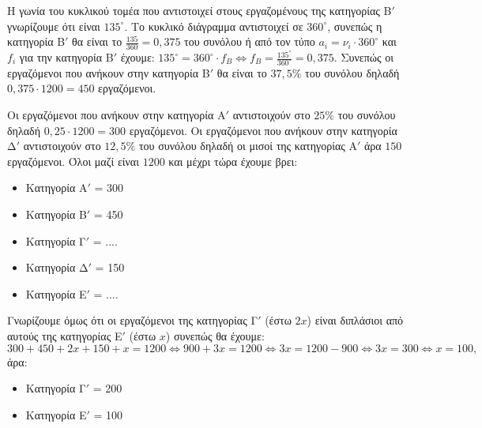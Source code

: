 \begin{alist}
\item Η γωνία του κυκλικού τομέα που αντιστοιχεί στους εργαζομένους της κατηγορίας Β$'$ γνωρίζουμε ότι είναι $135^\circ$. Το κυκλικό διάγραμμα αντιστοιχεί σε $360^\circ$, συνεπώς η κατηγορία Β$'$ θα είναι το $\frac{135}{360} = 0,375$ του συνόλου ή από τον τύπο $a_i = \nu_i \cdot 360^\circ$ και $f_i$ για την κατηγορία Β$'$ έχουμε: $135^\circ = 360^\circ \cdot f_B \Leftrightarrow f_B = \frac{135^\circ}{360^\circ} = 0,375$.
Συνεπώς οι εργαζόμενοι που ανήκουν στην κατηγορία Β$'$ θα είναι το $37,5\%$ του συνόλου δηλαδή $0,375 \cdot 1200 = 450$ εργαζόμενοι.

\item Οι εργαζόμενοι που ανήκουν στην κατηγορία Α$'$ αντιστοιχούν στο $25\%$ του συνόλου δηλαδή $0,25 \cdot 1200 = 300$ εργαζόμενοι.
Οι εργαζόμενοι που ανήκουν στην κατηγορία Δ$'$ αντιστοιχούν στο $12,5\%$ του συνόλου δηλαδή οι μισοί της κατηγορίας Α$'$ άρα $150$ εργαζόμενοι.
Όλοι μαζί είναι $1200$ και μέχρι τώρα έχουμε βρει:
\begin{itemize}
	\item Κατηγορία Α$'$ = 300
	\item Κατηγορία Β$'$ = 450
	\item Κατηγορία Γ$'$ = ....
	\item Κατηγορία Δ$'$ = 150
	\item Κατηγορία Ε$'$ = ....
\end{itemize}
Γνωρίζουμε όμως ότι οι εργαζόμενοι της κατηγορίας Γ$'$ (έστω $2x$) είναι διπλάσιοι από αυτούς της κατηγορίας Ε$'$ (έστω $x$) συνεπώς θα έχουμε:
\[ 300+450+2x+150+x=1200 \Leftrightarrow 900+3x=1200 \Leftrightarrow 3x=1200-900 \Leftrightarrow 3x=300 \Leftrightarrow x=100, \]
άρα:
\begin{itemize}
	\item Κατηγορία Γ$'$ = 200
	\item Κατηγορία Ε$'$ = 100
\end{itemize}


\end{alist}

